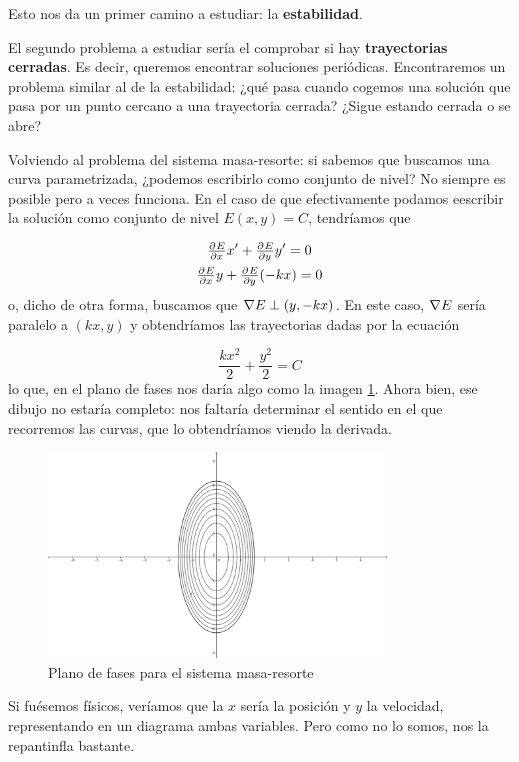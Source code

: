 Esto nos da un primer camino a estudiar: la \textbf{estabilidad}. 

El segundo problema a estudiar sería el comprobar si hay \textbf{trayectorias cerradas}. Es decir, queremos encontrar soluciones periódicas. Encontraremos un problema similar al de la estabilidad: ¿qué pasa cuando cogemos una solución que pasa por un punto cercano a una trayectoria cerrada? ¿Sigue estando cerrada o se abre? 

Volviendo al problema del sistema masa-resorte: si sabemos que buscamos una curva parametrizada, ¿podemos escribirlo como conjunto de nivel? No siempre es posible pero a veces funciona. En el caso de que efectivamente podamos eescribir la solución como conjunto de nivel $E(x,y) = C$, tendríamos que

\begin{gather*}
\pd{E}{x}  x' + \pd{E}{y}y' = 0 \\
\pd{E}{x} y + \pd{E}{y} (-kx) = 0
\end{gather*}
o, dicho de otra forma, buscamos que $\nabla E \perp (y,-kx)$. En este caso, $\nabla E$ sería paralelo a $(kx,y)$ y obtendríamos las trayectorias dadas por la ecuación

\[ \frac{kx^2}{2} + \frac{y^2}{2} = C 
\]
lo que, en el plano de fases nos daría algo como la imagen \ref{img:FasesMasaResorte}. Ahora bien, ese dibujo no estaría completo: nos faltaría determinar el sentido en el que recorremos las curvas, que lo obtendríamos viendo la derivada.

\begin{figure}[hbtp]
\centering
\includegraphics[width=0.8\textwidth]{img/PlanoFasesMasaResorte.png}
\caption{Plano de fases para el sistema masa-resorte}
\label{img:FasesMasaResorte}
\end{figure}

Si fuésemos físicos, veríamos que la $x$ sería la posición y $y$ la velocidad, representando en un diagrama ambas variables. Pero como no lo somos, nos la repantinfla bastante.


